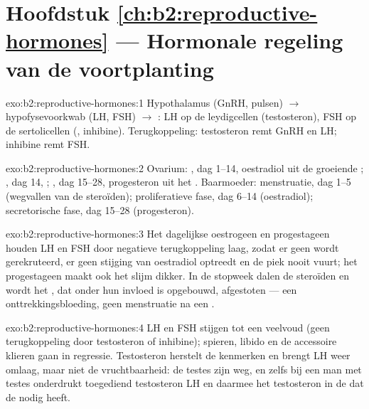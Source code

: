 \section*{Hoofdstuk \ref{ch:b2:reproductive-hormones} --- Hormonale regeling van de voortplanting}

\begin{solution}{exo:b2:reproductive-hormones:1}
Hypothalamus (GnRH, pulsen) $\to$ hypofysevoorkwab (LH, FSH) $\to$
: LH op de leydigcellen (testosteron), FSH op de sertolicellen
(, inhibine). Terugkoppeling: testosteron remt GnRH en
LH; inhibine remt FSH.
\end{solution}

\begin{solution}{exo:b2:reproductive-hormones:2}
Ovarium: , dag 1--14, oestradiol uit de groeiende
; , dag 14, ; , dag 15--28,
progesteron uit het . Baarmoeder: menstruatie, dag 1--5
(wegvallen van de steroïden); proliferatieve fase, dag 6--14 (oestradiol);
secretorische fase, dag 15--28 (progesteron).
\end{solution}

\begin{solution}{exo:b2:reproductive-hormones:3}
Het dagelijkse oestrogeen en progestageen houden LH en FSH door negatieve
terugkoppeling laag, zodat er geen  wordt gerekruteerd, er geen
stijging van oestradiol optreedt en de piek nooit vuurt; het progestageen
maakt ook het slijm dikker. In de stopweek dalen de steroïden en wordt het
, dat onder hun invloed is opgebouwd, afgestoten --- een
onttrekkingsbloeding, geen menstruatie na een .
\end{solution}

\begin{solution}{exo:b2:reproductive-hormones:4}
LH en FSH stijgen tot een veelvoud (geen terugkoppeling door testosteron
of inhibine); spieren, libido en de accessoire klieren gaan in regressie.
Testosteron herstelt de kenmerken en brengt LH weer omlaag, maar niet de
vruchtbaarheid: de testes zijn weg, en zelfs bij een man met testes
onderdrukt toegediend testosteron LH en daarmee het testosteron in de
 dat de  nodig heeft.
\end{solution}

